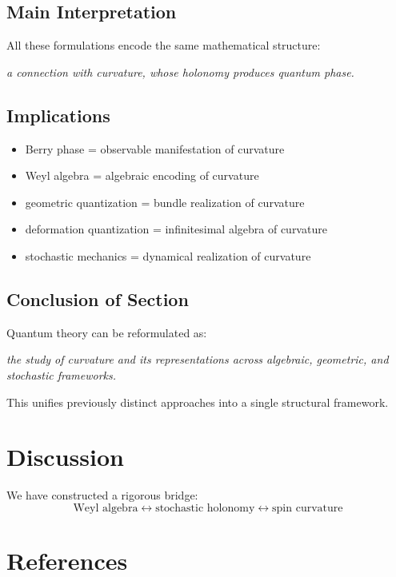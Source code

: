 \documentclass[11pt]{article}
\begin{document}
\subsection{Main Interpretation}

All these formulations encode the same mathematical structure:

\begin{center}
\emph{a connection with curvature, whose holonomy produces quantum phase.}
\end{center}

\subsection{Implications}

\begin{itemize}
\item Berry phase = observable manifestation of curvature
\item Weyl algebra = algebraic encoding of curvature
\item geometric quantization = bundle realization of curvature
\item deformation quantization = infinitesimal algebra of curvature
\item stochastic mechanics = dynamical realization of curvature
\end{itemize}

\subsection{Conclusion of Section}

Quantum theory can be reformulated as:

\begin{center}
\emph{the study of curvature and its representations across algebraic, geometric, and stochastic frameworks.}
\end{center}

This unifies previously distinct approaches into a single structural framework.
\section{Discussion}

We have constructed a rigorous bridge:
\[
\text{Weyl algebra} \longleftrightarrow \text{stochastic holonomy} \longleftrightarrow \text{spin curvature}
\]

\section*{References}
\end{document}
